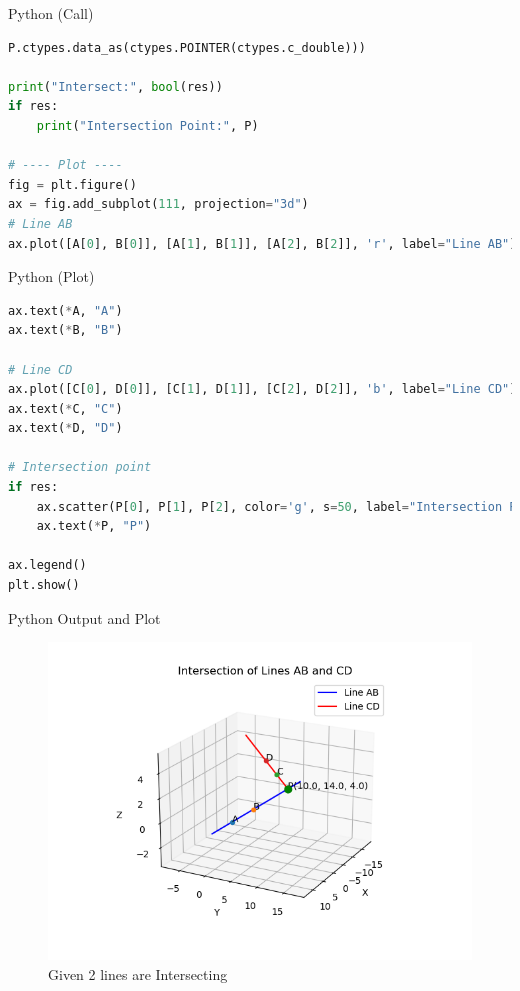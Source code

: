 \documentclass{beamer}
\begin{document}
\begin{frame}[fragile]{Python (Call)}
\begin{lstlisting}[language=Python]
                             P.ctypes.data_as(ctypes.POINTER(ctypes.c_double)))

print("Intersect:", bool(res))
if res:
    print("Intersection Point:", P)

# ---- Plot ----
fig = plt.figure()
ax = fig.add_subplot(111, projection="3d")
# Line AB
ax.plot([A[0], B[0]], [A[1], B[1]], [A[2], B[2]], 'r', label="Line AB")
\end{lstlisting}
\end{frame}

\begin{frame}[fragile]{Python (Plot)}
\begin{lstlisting}[language=Python]
ax.text(*A, "A")
ax.text(*B, "B")

# Line CD
ax.plot([C[0], D[0]], [C[1], D[1]], [C[2], D[2]], 'b', label="Line CD")
ax.text(*C, "C")
ax.text(*D, "D")

# Intersection point
if res:
    ax.scatter(P[0], P[1], P[2], color='g', s=50, label="Intersection P")
    ax.text(*P, "P")

ax.legend()
plt.show()


\end{lstlisting}
\end{frame}

\begin{frame}{Python Output and Plot}
\begin{figure}[h!]
\includegraphics[width=0.75\columnwidth]{figs/8.png}
\caption{Given 2 lines are Intersecting}
\end{figure}
\end{frame}
\end{document}
